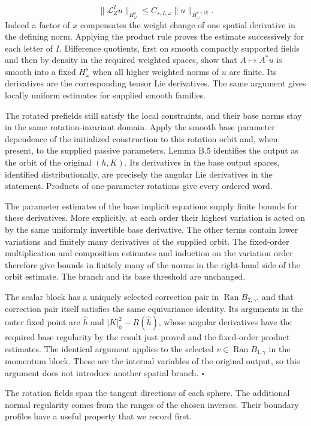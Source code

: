 \documentclass[
  english,
  11pt,
  reqno]{amsart}
\begin{document}
\label{eq:online-extension-angular-orbit-bound} \[
\|\mathcal L_Z^Iu\|_{H^s_\omega}
\le C_{s,I,\omega}\|u\|_{H^{s+|I|}_\omega}.
\] Indeed a factor of \(x\) compensates the weight change of one spatial
derivative in the defining norm. Applying the product rule proves the
estimate successively for each letter of \(I\). Difference quotients,
first on smooth compactly supported fields and then by density in the
required weighted spaces, show that \(A\mapsto A^*u\) is smooth into a
fixed \(H^s_\omega\) when all higher weighted norms of \(u\) are finite.
Its derivatives are the corresponding tensor Lie derivatives. The same
argument gives locally uniform estimates for supplied smooth families.

The rotated prefields still satisfy the local constraints, and their
base norms stay in the same rotation-invariant domain. Apply the smooth
base parameter dependence of the initialized construction to this
rotation orbit and, when present, to the supplied passive parameters.
Lemma B.5 identifies the output as the orbit of the original \((h,K)\).
Its derivatives in the base output spaces, identified distributionally,
are precisely the angular Lie derivatives in the statement. Products of
one-parameter rotations give every ordered word.

The parameter estimates of the base implicit equations supply finite
bounds for these derivatives. More explicitly, at each order their
highest variation is acted on by the same uniformly invertible base
derivative. The other terms contain lower variations and finitely many
derivatives of the supplied orbit. The fixed-order multiplication and
composition estimates and induction on the variation order therefore
give bounds in finitely many of the norms in the right-hand side of the
orbit estimate. The branch and its base threshold are unchanged.

The scalar block has a uniquely selected correction pair in
\(\operatorname{Ran}B_{2,\gamma}\), and that correction pair itself
satisfies the same equivariance identity. Its arguments in the outer
fixed point are \(\widehat h\) and \(|K|_h^2-R(\widehat h)\), whose
angular derivatives have the required base regularity by the result just
proved and the fixed-order product estimates. The identical argument
applies to the selected \(v\in\operatorname{Ran}B_{1,\gamma}\) in the
momentum block. These are the internal variables of the original output,
so this argument does not introduce another spatial branch.
\hfill\(\square\)

The rotation fields span the tangent directions of each sphere. The
additional normal regularity comes from the ranges of the chosen
inverses. Their boundary profiles have a useful property that we record
first.
\end{document}
